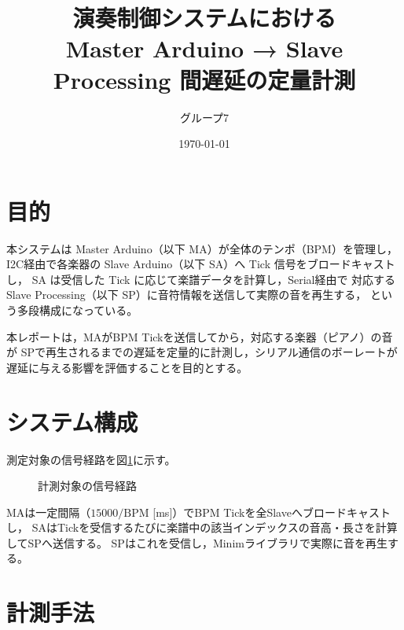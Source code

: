 \documentclass[11pt,a4paper]{ltjsarticle}
\title{演奏制御システムにおける\\Master Arduino → Slave Processing 間遅延の定量計測}
\author{グループ7}
\date{\today}
\begin{document}
\maketitle

\section{目的}
本システムは Master Arduino（以下 MA）が全体のテンポ（BPM）を管理し，
I2C経由で各楽器の Slave Arduino（以下 SA）へ Tick 信号をブロードキャストし，
SA は受信した Tick に応じて楽譜データを計算し，Serial経由で
対応する Slave Processing（以下 SP）に音符情報を送信して実際の音を再生する，
という多段構成になっている。

本レポートは，MAがBPM Tickを送信してから，対応する楽器（ピアノ）の音が
SPで再生されるまでの遅延を定量的に計測し，シリアル通信のボーレートが
遅延に与える影響を評価することを目的とする。

\section{システム構成}
測定対象の信号経路を図\ref{fig:architecture}に示す。

\begin{figure}[h]
\centering
{}
\caption{計測対象の信号経路}
\label{fig:architecture}
\end{figure}

MAは一定間隔（$15000/\mathrm{BPM}$ [ms]）でBPM Tickを全Slaveへブロードキャストし，
SAはTickを受信するたびに楽譜中の該当インデックスの音高・長さを計算してSPへ送信する。
SPはこれを受信し，Minimライブラリで実際に音を再生する。

\section{計測手法}
\end{document}
